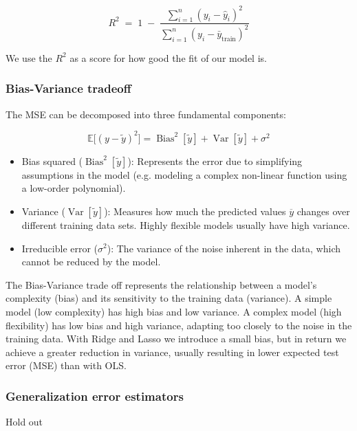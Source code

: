 \documentclass[amssymb,twocolumn,aps]{revtex4-2}
\begin{document}
\begin{equation}
    R^2 \;=\; 1 \;-\; \frac{\sum_{i=1}^n (y_i - \hat y_i)^2}{\sum_{i=1}^n (y_i - \bar y_{\text{train}})^2}
\end{equation}

We use the $R^2$ as a score for how good the fit of our model is. 

\subsubsection{Bias-Variance tradeoff}

The MSE can be decomposed into three fundamental components: 

\begin{equation}
    \mathbb{E}\!\big[(y-\tilde y)^2\big]
= \operatorname{Bias}^2[\tilde y]
+ \operatorname{Var}[\tilde y]
+ \sigma^2
\end{equation}

\begin{itemize}
    \item Bias squared ($\operatorname{Bias}^2[\tilde y]$): Represents the error due to simplifying assumptions in the model (e.g. modeling a complex non-linear function using a low-order polynomial). 
    \item Variance ($\operatorname{Var}[\tilde y]$): Measures how much the predicted values $\overline{y}$ changes over different training data sets. Highly flexible models usually have high variance. 
    \item Irreducible error ($\sigma^2$): The variance of the noise inherent in the data, which cannot be reduced by the model. 
\end{itemize}

The Bias-Variance trade off represents the relationship between a model's complexity (bias) and its sensitivity to the training data (variance). 
A simple model (low complexity) has high bias and low variance. 
A complex model (high flexibility) has low bias and high variance, adapting too closely to the noise in the training data. With Ridge and Lasso we introduce a small bias, but in return we achieve a greater reduction in variance, usually resulting in lower expected test error (MSE) than with OLS. 

\subsubsection{Generalization error estimators}

{Hold out}
\end{document}

